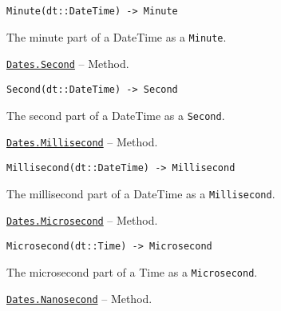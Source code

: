 \begin{adjustwidth}{2em}{0pt}


\begin{verbatim}
Minute(dt::DateTime) -> Minute
\end{verbatim}

The minute part of a DateTime as a \texttt{Minute}.



\end{adjustwidth}
\hypertarget{544402402471521748}{} 
\hyperlink{544402402471521748}{\texttt{Dates.Second}}  -- {Method.}

\begin{adjustwidth}{2em}{0pt}


\begin{verbatim}
Second(dt::DateTime) -> Second
\end{verbatim}

The second part of a DateTime as a \texttt{Second}.



\end{adjustwidth}
\hypertarget{9366634148855607364}{} 
\hyperlink{9366634148855607364}{\texttt{Dates.Millisecond}}  -- {Method.}

\begin{adjustwidth}{2em}{0pt}


\begin{verbatim}
Millisecond(dt::DateTime) -> Millisecond
\end{verbatim}

The millisecond part of a DateTime as a \texttt{Millisecond}.



\end{adjustwidth}
\hypertarget{4155472013117853166}{} 
\hyperlink{4155472013117853166}{\texttt{Dates.Microsecond}}  -- {Method.}

\begin{adjustwidth}{2em}{0pt}


\begin{verbatim}
Microsecond(dt::Time) -> Microsecond
\end{verbatim}

The microsecond part of a Time as a \texttt{Microsecond}.



\end{adjustwidth}
\hypertarget{14345635682555926790}{} 
\hyperlink{14345635682555926790}{\texttt{Dates.Nanosecond}}  -- {Method.}

